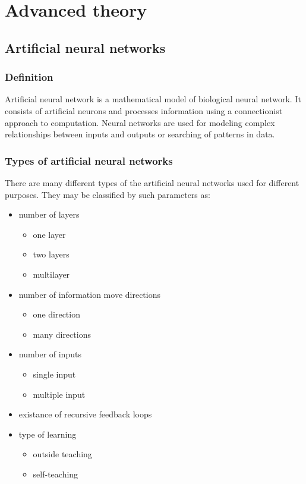 \documentclass[a4paper,12pt]{article}
\begin{document}
\section{Advanced theory}
\subsection{Artificial neural networks}
\subsubsection{Definition}

Artificial neural network is a mathematical model of biological neural network. It consists of artificial neurons and processes information using a connectionist approach to computation. Neural networks are used for modeling complex relationships between inputs and outputs or searching of patterns in data.

\subsubsection{Types of artificial neural networks}

There are many different types of the artificial neural networks used for different purposes. They may be classified by such parameters as:
\begin{itemize}
 \item number of layers
  \begin{itemize}
   \item one layer
   \item two layers
   \item multilayer
  \end{itemize}
  \item number of information move directions
  \begin{itemize}
   \item one direction
   \item many directions
  \end{itemize}
  \item number of inputs
  \begin{itemize}
   \item single input 
   \item multiple input
  \end{itemize}
  \item existance of recursive feedback loops
  \item type of learning
  \begin{itemize}
   \item outside teaching
   \item self-teaching
  \end{itemize}

\end{itemize}
\end{document}
